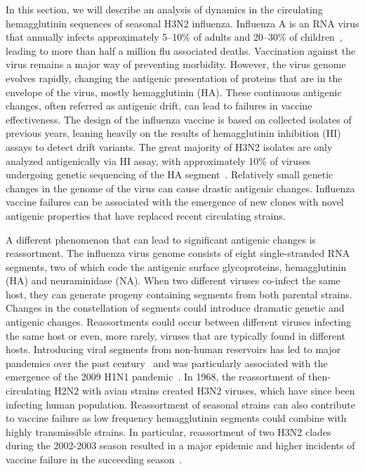 \documentclass[a4paper,11pt]{article}
\begin{document}
In this section, we will describe an analysis of dynamics in the circulating hemagglutinin sequences of seasonal H3N2 influenza.
Influenza A is an RNA virus that annually infects approximately 5--10\% of adults and 20--30\% of children~\cite{WHO}, leading to more than half a million flu associated deaths.
Vaccination against the virus remains a major way of preventing morbidity.
However, the virus genome evolves rapidly, changing the antigenic presentation of proteins that are in the envelope of the virus, mostly hemagglutinin (HA).
These continuous antigenic changes, often referred as antigenic drift, can lead to failures in vaccine effectiveness.
The design of the influenza vaccine is based on collected isolates of previous years, leaning heavily on the results of hemagglutinin inhibition (HI) assays to detect drift variants.
The great majority of H3N2 isolates are only analyzed antigenically via HI assay, with approximately 10\% of viruses undergoing genetic sequencing of the HA segment~\cite{russell2008influenza}.
Relatively small genetic changes in the genome of the virus can cause drastic antigenic changes.
Influenza vaccine failures can be associated with the emergence of new clones with novel antigenic properties that have replaced recent circulating strains.

A different phenomenon that can lead to significant antigenic changes is reassortment.
The influenza virus genome consists of eight single-stranded RNA segments, two of which code the antigenic surface glycoproteins, hemagglutinin (HA) and neuraminidase (NA).
When two different viruses co-infect the same host, they can generate  progeny containing segments from both parental strains.
Changes in the constellation of segments could introduce dramatic genetic and antigenic changes.
Reassortments could occur between different viruses infecting the same host or even, more rarely, viruses that are typically found in different hosts.
Introducing viral segments from non-human reservoirs has led to major pandemics over the past century~\cite{rabadan2007evolution, rabadan2008non} and was particularly associated with the emergence of the 2009 H1N1 pandemic~\cite{trifonov2009geographic, solovyov2009cluster}.
In 1968, the reassortment of then-circulating H2N2 with avian strains created H3N2 viruses, which have since been infecting human population.
Reassortment of seasonal strains can also contribute to vaccine failure as low frequency hemagglutinin segments could combine with highly transmissible strains.
In particular, reassortment of two H3N2 clades during the 2002-2003 season resulted in a major epidemic and higher incidents of vaccine failure in the succeeding season~\cite{centers2004preliminary}.
\end{document}
